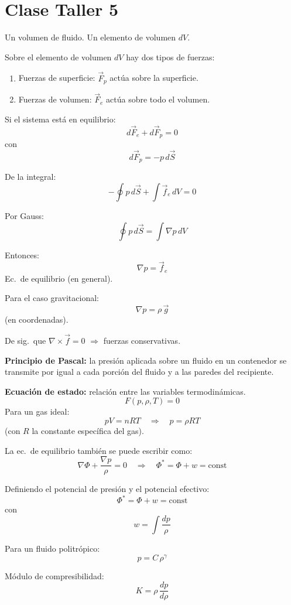 \chapter{Clase Taller 5}
Un volumen de fluido. Un elemento de volumen $dV$.

Sobre el elemento de volumen $dV$ hay dos tipos de fuerzas:

\begin{enumerate}
    \item Fuerzas de superficie: $\vec{F}_p$ actúa sobre la superficie.
    \item Fuerzas de volumen: $\vec{F}_e$ actúa sobre todo el volumen.
\end{enumerate}

Si el sistema está en equilibrio:
$$
d\vec{F}_e + d\vec{F}_p = 0
$$
con
$$
d\vec{F}_p = -p\,d\vec{S}
$$

De la integral:
$$
-\oint p\,d\vec{S} + \int \vec{f}_e\,dV = 0
$$

Por Gauss:
$$
\oint p\,d\vec{S} = \int \nabla p\,dV
$$

Entonces:
$$
\boxed{\nabla p = \vec{f}_e}
$$
Ec.\ de equilibrio (en general).

Para el caso gravitacional:
$$
\nabla p = \rho\,\vec{g}
$$
(en coordenadas).

De sig.\ que $\nabla \times \vec{f} = 0$ $\Rightarrow$ fuerzas conservativas.

\vspace{1em}

\noindent\textbf{Principio de Pascal:} la presión aplicada sobre un fluido en un contenedor se transmite por igual a cada porción del fluido y a las paredes del recipiente.

\vspace{1em}

\noindent\textbf{Ecuación de estado:} relación entre las variables termodinámicas.
$$
F(p,\rho,T) = 0
$$
Para un gas ideal:
$$
pV = nRT \quad \Longrightarrow \quad p = \rho R T
$$
(con $R$ la constante específica del gas).

La ec.\ de equilibrio también se puede escribir como:
$$
\nabla\Phi + \frac{\nabla p}{\rho} = 0
\quad\Longrightarrow\quad
\Phi^* = \Phi + w = \text{const}
$$

Definiendo el potencial de presión y el potencial efectivo:
$$
\Phi^* = \Phi + w = \text{const}
$$
con
$$
w = \int \frac{dp}{\rho}
$$

Para un fluido politrópico:
$$
p = C\,\rho^{\gamma}
$$

Módulo de compresibilidad:
$$
K = \rho\,\frac{dp}{d\rho}
$$

